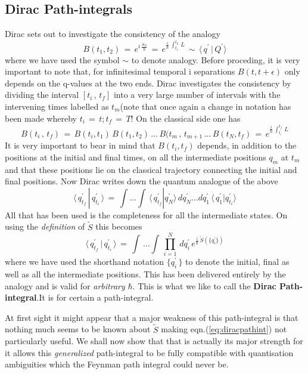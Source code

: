 \documentclass[a4paper]{JHEP3}
\newcommand{\be}{\begin{equation}}
\newcommand{\ee}{\end{equation}}
\begin{document}
\subsection{Dirac Path-integrals}
Dirac sets out to investigate the consistency of the analogy
\be
\label{eq:consistency}
B(t_1,t_2)\,=\,e^{i\,\frac{S_{cl}}{\hbar}}\,=\,e^{\frac{i}{\hbar}\,\int_{t_1}^{t_2}\,L}\,\sim\,\langle\,q^\prime\,|\,Q^\prime\rangle
\ee
where we have used the symbol $\sim$ to denote analogy. Before proceding, it is very important to note that, for infinitesimal temporal i
separations $B(t,t+\epsilon)$ only depends on the q-values at the two ends. Dirac investigates the consistency by dividing the interval
$[t_i\,,\,t_f]$ into a very large number of intervals with the intervening times labelled as $t_m$(note that once again a change in notation
has been made whereby $t_i\,=\,t;t_f\,=\,T$! On the classical side one has
\be
\label{eq:consistency1}
B(t_i\,,\,t_f)\,=\,B(t_i,t_1)\,B(t_1,t_2)\,\ldots\,B(t_m\,,\,t_{m+1}\,\ldots\,B(t_N,t_f)\,=\,e^{\frac{i}{\hbar}\,\int_{t_i}^{t_f}\,L}
\ee
It is very important to bear in mind that $B(t_i,t_f)$ depends, in addition to the positions at the initial and final times, on all the 
intermediate positions $q_m$ at $t_m$ and that these positions lie on the classical trajectory connecting the initial and final positions.
Now Dirac writes down the quantum analogue of the above
\be
\label{eq:qconsistency}
\langle\,q_{t_f}^\prime\,|\,q_{t_i}^\prime\,\rangle\,=\,\int\ldots\int\,\langle\,q_{t_f}^\prime|q_N^\prime\rangle\,dq_N^\prime\ldots
dq_1^\prime\,\langle\,q_1^\prime|q_{t_i}^\prime\rangle
\ee
All that has been used is the completeness for all the intermediate states. On using the {\it definition} of ${\tilde S}$ this becomes
\be
\label{eq:diracpathint}
\langle\,q_{t_f}^\prime\,|\,q_{t_i}^\prime\,\rangle\,=\,\int\,\ldots\int\,\prod_{i=1}^{N}\,dq_i^\prime\,e^{\frac{i}{\hbar}\,{\tilde S}(\{q_i^\prime\})}
\ee 
where we have used the shorthand notation $\{q_i^\prime\,\}$ to denote the initial, final as well as all the intermediate positions. This
has been delivered entirely by the analogy and is valid for {\it arbitrary} $\hbar$. This is what we like to call the {\bf Dirac Path-integral}.It is for certain a path-integral.

At first sight it might appear that a major weakness of this path-integral is that nothing much seems to be known about ${\tilde S}$ making
 eqn.(\ref{eq:diracpathint}) not particularly useful. We shall now show that that is actually its major strength for it allows this
{\it generalized} path-integral to be fully compatible with quantisation ambiguities which the Feynman path integral could never be.
\end{document}
